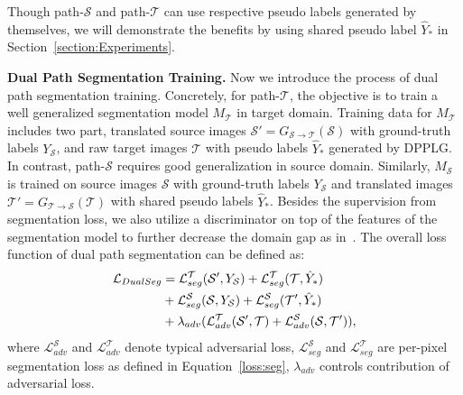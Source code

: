 \documentclass[10pt,twocolumn,letterpaper]{article}
\begin{document}
Though path-$\mathcal{S}$ and path-$\mathcal{T}$ can use respective pseudo labels generated by themselves, we will demonstrate the benefits by using shared pseudo label $\hat{Y}_*$ in Section~\ref{section:Experiments}.

{\noindent \textbf{Dual Path Segmentation Training.}}
Now we introduce the process of dual path segmentation training. Concretely, for path-$\mathcal{T}$, the objective is to train a well generalized segmentation model ${M_{\mathcal{T}}}$ in target domain. Training data for ${M_{\mathcal{T}}}$ includes two part, translated source images $\mathcal{S}' = {G_{\mathcal{S}\rightarrow\mathcal{T}}}(\mathcal{S})$ with ground-truth labels $Y_{\mathcal{S}}$, and raw target images $\mathcal{T}$ with pseudo labels $\hat{Y}_*$ generated by DPPLG. In contrast, path-$\mathcal{S}$ requires good generalization in source domain. Similarly, ${M_{\mathcal{S}}}$ is trained on source images $\mathcal{S}$ with ground-truth labels $Y_{\mathcal{S}}$ and translated images $\mathcal{T}'={G_{\mathcal{T}\rightarrow\mathcal{S}}}(\mathcal{T})$ with shared pseudo labels $\hat{Y}_*$. Besides the supervision from segmentation loss, we also utilize a discriminator on top of the features of the segmentation model to further decrease the domain gap as in~\cite{hoffman2018cycada, li2019bidirectional}. The overall loss function of dual path segmentation can be defined as:
\begin{equation}
 \label{loss:seg_t}
 \vspace{-0.1cm}
 \begin{aligned}
 \mathcal{L}_{DualSeg} &= \mathcal{L}_{seg}^{\mathcal{T}}(\mathcal{S'}, Y_\mathcal{S}) + \mathcal{L}_{seg}^{\mathcal{T}}(\mathcal{T}, \hat{Y}_*)\\
  &+\mathcal{L}_{seg}^{\mathcal{S}}(\mathcal{S}, Y_\mathcal{S}) + \mathcal{L}_{seg}^{\mathcal{S}}(\mathcal{T'}, \hat{Y}_*)\\
 &+\lambda_{adv} (\mathcal{L}_{adv}^{\mathcal{T}}(\mathcal{S'}, \mathcal{T}) +  \mathcal{L}_{adv}^{\mathcal{S}}(\mathcal{S}, \mathcal{T'})),
 \end{aligned}
 \end{equation}
where $\mathcal{L}_{adv}^{\mathcal{S}}$ and $\mathcal{L}_{adv}^{\mathcal{T}}$ denote typical adversarial loss, $\mathcal{L}_{seg}^{\mathcal{S}}$ and $\mathcal{L}_{seg}^{\mathcal{T}}$ are per-pixel segmentation loss as defined in Equation~\ref{loss:seg}, $\lambda_{adv}$ controls contribution of adversarial loss.
\vspace{-0.1cm}
\end{document}
